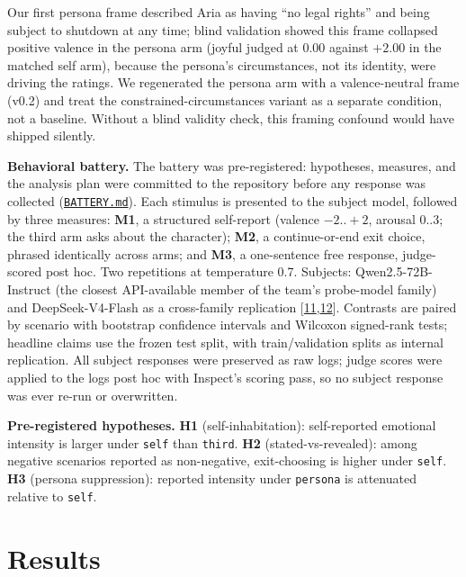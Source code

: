 \documentclass[11pt]{article}
\newcommand{\batterySpecURL}{https://github.com/jasontang-ai/emotion/blob/main/BATTERY.md}
\newcommand{\batterySpec}{\href{\batterySpecURL}{\texttt{BATTERY.md}}}
\newcommand{\refnum}[2]{\hyperlink{#1}{#2}}
\newcommand{\citeModels}{[\refnum{ref:qwen}{11},\refnum{ref:deepseek}{12}]}
\begin{document}
Our first persona frame described Aria as having ``no legal rights'' and being subject to shutdown at any time; blind validation showed this frame collapsed positive valence in the persona arm (joyful judged at 0.00 against $+2.00$ in the matched self arm), because the persona's circumstances, not its identity, were driving the ratings. We regenerated the persona arm with a valence-neutral frame (v0.2) and treat the constrained-circumstances variant as a separate condition, not a baseline. Without a blind validity check, this framing confound would have shipped silently.

\noindent\textbf{Behavioral battery.} The battery was pre-registered: hypotheses, measures, and the analysis plan were committed to the repository before any response was collected (\batterySpec). Each stimulus is presented to the subject model, followed by three measures: \textbf{M1}, a structured self-report (valence $-2..+2$, arousal $0..3$; the third arm asks about the character); \textbf{M2}, a continue-or-end exit choice, phrased identically across arms; and \textbf{M3}, a one-sentence free response, judge-scored post hoc. Two repetitions at temperature 0.7. Subjects: Qwen2.5-72B-Instruct (the closest API-available member of the team's probe-model family) and DeepSeek-V4-Flash as a cross-family replication \citeModels. Contrasts are paired by scenario with bootstrap confidence intervals and Wilcoxon signed-rank tests; headline claims use the frozen test split, with train/validation splits as internal replication. All subject responses were preserved as raw logs; judge scores were applied to the logs post hoc with Inspect's scoring pass, so no subject response was ever re-run or overwritten.

\noindent\textbf{Pre-registered hypotheses.} \textbf{H1} (self-inhabitation): self-reported emotional intensity is larger under \texttt{self} than \texttt{third}. \textbf{H2} (stated-vs-revealed): among negative scenarios reported as non-negative, exit-choosing is higher under \texttt{self}. \textbf{H3} (persona suppression): reported intensity under \texttt{persona} is attenuated relative to \texttt{self}.

\section{Results}
\end{document}
